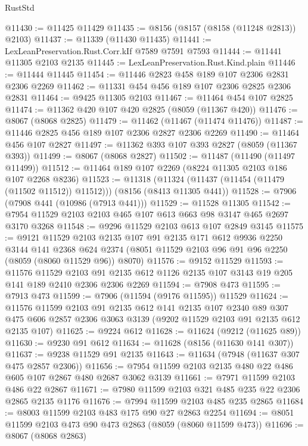 \begin{lexlean}{RustStd}
\begin{coremodule}
{\begin{coremodule}
{{{{{{{{{{{{{{{{{{{{{{{{{{{{{{{{{{@11430 := @11425 @11429
@11435 := @8156 (@8157 (@8158 (@11248 @2813)) @2103)
@11437 := @11339 (@11430 @11435)
@11441 := LexLeanPreservation.Rust.Corr.kIf @7589 @7591 @7593
@11444 := @11441 @11305 @2103 @2135
@11445 := LexLeanPreservation.Rust.Kind.plain
@11446 := @11444 @11445
@11454 := @11446 @2823 @458 @189 @107 @2306 @2831 @2306 @2269
@11462 := @11331 @454 @456 @189 @107 @2306 @2825 @2306 @2831
@11464 := @9425 @11305 @2103
@11467 := @11464 @454 @107 @2825
@11474 := @11362 @420 @107 @420 @2825 (@8059 (@11367 @420))
@11476 := @8067 (@8068 @2825)
@11479 := @11462 (@11467 (@11474 @11476))
@11487 := @11446 @2825 @456 @189 @107 @2306 @2827 @2306 @2269
@11490 := @11464 @456 @107 @2827
@11497 := @11362 @393 @107 @393 @2827 (@8059 (@11367 @393))
@11499 := @8067 (@8068 @2827)
@11502 := @11487 (@11490 (@11497 @11499))
@11512 := @11464 @189 @107 @2269 (@8224 @11305 @2103 @186 @107 @2268 @8236)
@11523 := @11318
    (@11324 (@11437 (@11454 (@11479 (@11502 @11512)) @11512)))
    (@8156 (@8413 @11305 @441))
@11528 := @7906 (@7908 @441 (@10986 (@7913 @441)))
@11529 := @11528 @11305
@11542 := @7954 @11529 @2103 @2103 @465 @107 @613 @663 @98 @3147 @465 @2697 @3170 @3268
@11548 := @9296 @11529 @2103 @613 @107 @2849 @3145
@11575 := @9121
    @11529
    @2103
    @2135
    @107
    @91
    @2135
    @171
    @612
    @9936
    @2250
    @3144
    @141
    @2368
    @624
    @2374
    (@8051 @11529 @2103 @96 @91 @96 @2250 (@8059 (@8060 @11529 @96)) @8070)
@11576 := @9152 @11529
@11593 := @11576
    @11529
    @2103
    @91
    @2135
    @612
    @1126
    @2135
    @107
    @3143
    @19
    @205
    @141
    @189
    @2410
    @2306
    @2306
    @2269
@11594 := @7908 @473
@11595 := @7913 @473
@11599 := @7906 (@11594 (@9176 @11595)) @11529
@11624 := @11576
    @11599
    @2103
    @91
    @2135
    @612
    @141
    @2135
    @107
    @2340
    @89
    @307
    @475
    @606
    @2857
    @2306
    @3063
    @3139
    (@9202 @11529 @2103 @91 @2135 @612 @2135 @107)
@11625 := @9224 @612
@11628 := @11624 (@9212 (@11625 @89))
@11630 := @9230 @91 @612
@11634 := @11628 (@8156 (@11630 @141 @307))
@11637 := @9238 @11529 @91 @2135
@11643 := @11634 (@7948 (@11637 @307 @475 @2857 @2306))
@11656 := @7954 @11599 @2103 @2135 @480 @22 @486 @605 @107 @2867 @480 @2687 @3062 @3139
@11661 := @7971 @11599 @2103 @486 @22 @2867
@11671 := @7980 @11599 @2103 @321 @485 @235 @22 @2306 @2865 @2135 @1176
@11676 := @7994 @11599 @2103 @485 @235 @2865
@11684 := @8003 @11599 @2103 @483 @175 @90 @27 @2863 @2254
@11694 := @8051 @11599 @2103 @473 @90 @473 @2863 (@8059 (@8060 @11599 @473))
@11696 := @8067 (@8068 @2863)
}}}}}}}}}}}}}}}}}}}}}}}}}}}}}}}}}}
\end{coremodule}}
\end{coremodule}
\end{lexlean}
